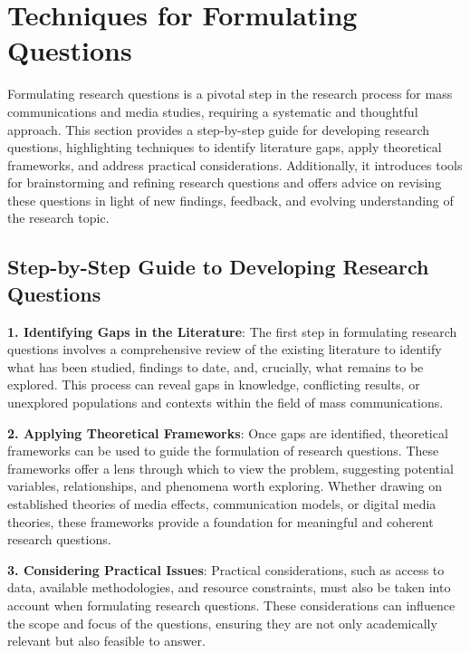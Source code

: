 \documentclass[
]{book}
\begin{document}
\hypertarget{techniques-for-formulating-questions}{%
\section*{Techniques for Formulating Questions}\label{techniques-for-formulating-questions}}

Formulating research questions is a pivotal step in the research process for mass communications and media studies, requiring a systematic and thoughtful approach. This section provides a step-by-step guide for developing research questions, highlighting techniques to identify literature gaps, apply theoretical frameworks, and address practical considerations. Additionally, it introduces tools for brainstorming and refining research questions and offers advice on revising these questions in light of new findings, feedback, and evolving understanding of the research topic.

\hypertarget{step-by-step-guide-to-developing-research-questions}{%
\subsection*{Step-by-Step Guide to Developing Research Questions}\label{step-by-step-guide-to-developing-research-questions}}

\textbf{1. Identifying Gaps in the Literature}: The first step in formulating research questions involves a comprehensive review of the existing literature to identify what has been studied, findings to date, and, crucially, what remains to be explored. This process can reveal gaps in knowledge, conflicting results, or unexplored populations and contexts within the field of mass communications.

\textbf{2. Applying Theoretical Frameworks}: Once gaps are identified, theoretical frameworks can be used to guide the formulation of research questions. These frameworks offer a lens through which to view the problem, suggesting potential variables, relationships, and phenomena worth exploring. Whether drawing on established theories of media effects, communication models, or digital media theories, these frameworks provide a foundation for meaningful and coherent research questions.

\textbf{3. Considering Practical Issues}: Practical considerations, such as access to data, available methodologies, and resource constraints, must also be taken into account when formulating research questions. These considerations can influence the scope and focus of the questions, ensuring they are not only academically relevant but also feasible to answer.
\end{document}
